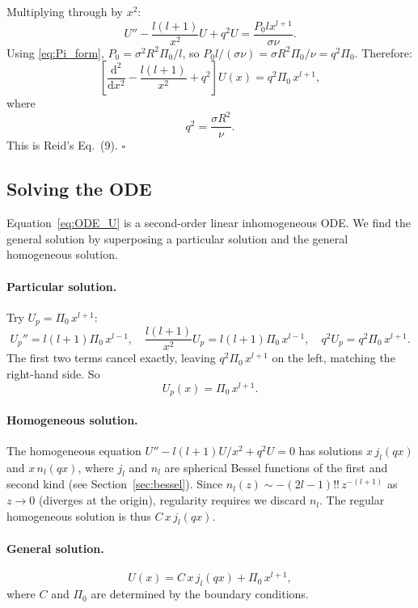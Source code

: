 \documentclass[12pt]{article}
\newcommand{\dd}{\mathrm{d}}
\theoremstyle{definition}
\begin{document}
\begin{derivbox}
Multiplying through by $x^2$:
\[
  U'' - \frac{l(l+1)}{x^2}U + q^2 U = \frac{P_0 l x^{l+1}}{\sigma\nu}.
\]
Using \eqref{eq:Pi_form}, $P_0 = \sigma^2 R^2 \Pi_0/l$, so
$P_0 l/(\sigma\nu) = \sigma R^2 \Pi_0/\nu = q^2\Pi_0$. Therefore:
\begin{equation}
  \boxed{
    \left[\frac{\dd^2}{\dd x^2} - \frac{l(l+1)}{x^2} + q^2\right]U(x) = q^2\Pi_0\,x^{l+1},
  }
  \label{eq:ODE_U}
\end{equation}
where
\begin{equation}
  q^2 = \frac{\sigma R^2}{\nu}.
  \label{eq:q_def}
\end{equation}
This is Reid's Eq.~(9). \hfill$\square$
\end{derivbox}

\subsection{Solving the ODE}

Equation~\eqref{eq:ODE_U} is a second-order linear inhomogeneous ODE. We find
the general solution by superposing a particular solution and the general
homogeneous solution.

\paragraph{Particular solution.}
Try $U_p = \Pi_0\,x^{l+1}$:
\[
  U_p'' = l(l+1)\Pi_0\,x^{l-1}, 
  \quad
  \frac{l(l+1)}{x^2}U_p = l(l+1)\Pi_0\,x^{l-1},
  \quad
  q^2 U_p = q^2\Pi_0\,x^{l+1}.
\]
The first two terms cancel exactly, leaving $q^2\Pi_0\,x^{l+1}$ on the left, matching
the right-hand side. So
\begin{equation}
  U_p(x) = \Pi_0\,x^{l+1}.
\end{equation}

\paragraph{Homogeneous solution.}
The homogeneous equation $U'' - l(l+1)U/x^2 + q^2 U = 0$ has solutions $x\,j_l(qx)$
and $x\,n_l(qx)$, where $j_l$ and $n_l$ are spherical Bessel functions of the first
and second kind (see Section~\ref{sec:bessel}). Since $n_l(z) \sim -(2l-1)!!\,z^{-(l+1)}$ as
$z\to 0$ (diverges at the origin), regularity requires we discard $n_l$. The regular homogeneous
solution is thus $C\,x\,j_l(qx)$.

\paragraph{General solution.}
\begin{equation}
  U(x) = C\,x\,j_l(qx) + \Pi_0\,x^{l+1},
  \label{eq:U_general}
\end{equation}
where $C$ and $\Pi_0$ are determined by the boundary conditions.
\end{document}
